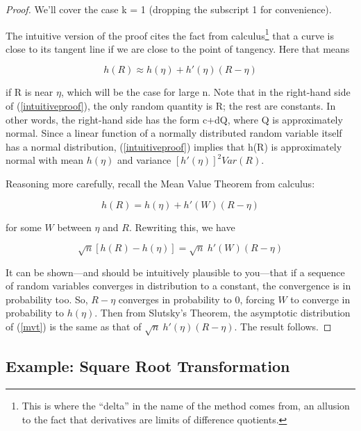 \begin{proof}

We'll cover the case k = 1 (dropping the subscript 1 for convenience).

The intuitive version of the proof cites the fact from
calculus\footnote{This is where the ``delta'' in the name of the method
comes from, an allusion to the fact that derivatives are limits of
difference quotients.} that a curve is close to its tangent line if we
are close to the point of tangency.  Here that means

\begin{equation}
\label{intuitiveproof}
h(R) \approx h(\eta) + h'(\eta) (R - \eta) 
\end{equation}

if R is near $\eta$, which will be the case for large n.  Note that in
the right-hand side of (\ref{intuitiveproof}), the only random quantity
is R; the rest are constants.  In other words, the right-hand side
has the form c+dQ, where Q is approximately normal.  Since a linear
function of a normally distributed random variable itself has a normal
distribution, (\ref{intuitiveproof}) implies that h(R) is approximately
normal with mean $h(\eta)$ and variance $[h'(\eta)]^2 Var(R)$.

Reasoning more carefully, recall the Mean Value Theorem from calculus:

\begin{equation}
h(R) = h(\eta) + h'(W) (R - \eta) 
\end{equation}

for some $W$ between $\eta$ and $R$.  Rewriting this, we have

\begin{equation}
\label{mvt}
\sqrt{n}[h(R) - h(\eta)] = \sqrt{n} ~ h'(W) (R - \eta)
\end{equation}

It can be shown---and should be intuitively plausible to you---that if a
sequence of random variables converges in distribution to a constant,
the convergence is in probability too.  So, $R - \eta$ converges in
probability to 0, forcing $W$ to converge in probability to $h(\eta)$.
Then from Slutsky's Theorem, the asymptotic distribution of (\ref{mvt})
is the same as that of $\sqrt{n}~  h'(\eta) (R - \eta)$.  The result
follows.

\end{proof}

\subsection{Example:  Square Root Transformation}
\label{varstabxform}

